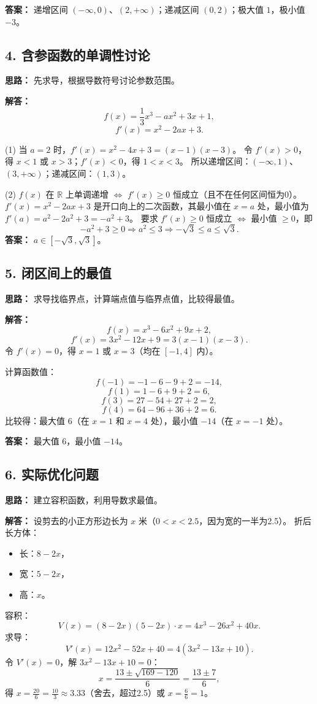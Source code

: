 \documentclass[10pt]{article}
\begin{document}
\textbf{答案：} 递增区间 $(-\infty,0)$、$(2,+\infty)$；递减区间 $(0,2)$；极大值 $1$，极小值 $-3$。

\subsection*{4. 含参函数的单调性讨论}
\textbf{思路：} 先求导，根据导数符号讨论参数范围。

\textbf{解答：}
$$f(x) = \frac{1}{3}x^3 - a x^2 + 3x + 1,$$
$$f'(x) = x^2 - 2a x + 3.$$

(1) 当 $a=2$ 时，$f'(x) = x^2 - 4x + 3 = (x-1)(x-3)$。
令 $f'(x) > 0$，得 $x < 1$ 或 $x > 3$；$f'(x) < 0$，得 $1 < x < 3$。
所以递增区间：$(-\infty, 1)$、$(3, +\infty)$；递减区间：$(1, 3)$。

(2) $f(x)$ 在 $\mathbb{R}$ 上单调递增 $\iff$ $f'(x) \ge 0$ 恒成立（且不在任何区间恒为0）。
$f'(x) = x^2 - 2a x + 3$ 是开口向上的二次函数，其最小值在 $x = a$ 处，最小值为 $f'(a) = a^2 - 2a^2 + 3 = -a^2 + 3$。
要求 $f'(x) \ge 0$ 恒成立 $\iff$ 最小值 $\ge 0$，即
$$-a^2 + 3 \ge 0 \Rightarrow a^2 \le 3 \Rightarrow -\sqrt{3} \le a \le \sqrt{3}.$$
\textbf{答案：} $a \in [-\sqrt{3}, \sqrt{3}]$。

\subsection*{5. 闭区间上的最值}
\textbf{思路：} 求导找临界点，计算端点值与临界点值，比较得最值。

\textbf{解答：}
$$f(x) = x^3 - 6x^2 + 9x + 2,$$
$$f'(x) = 3x^2 - 12x + 9 = 3(x-1)(x-3).$$
令 $f'(x) = 0$，得 $x = 1$ 或 $x = 3$（均在 $[-1,4]$ 内）。

计算函数值：
$$f(-1) = -1 - 6 - 9 + 2 = -14,$$
$$f(1) = 1 - 6 + 9 + 2 = 6,$$
$$f(3) = 27 - 54 + 27 + 2 = 2,$$
$$f(4) = 64 - 96 + 36 + 2 = 6.$$
比较得：最大值 $6$（在 $x=1$ 和 $x=4$ 处），最小值 $-14$（在 $x=-1$ 处）。

\textbf{答案：} 最大值 $6$，最小值 $-14$。

\subsection*{6. 实际优化问题}
\textbf{思路：} 建立容积函数，利用导数求最值。

\textbf{解答：}
设剪去的小正方形边长为 $x$ 米（$0 < x < 2.5$，因为宽的一半为2.5）。
折后长方体：
\begin{itemize}
    \item 长：$8 - 2x$，
    \item 宽：$5 - 2x$，
    \item 高：$x$。
\end{itemize}
容积：
$$V(x) = (8 - 2x)(5 - 2x) \cdot x = 4x^3 - 26x^2 + 40x.$$
求导：
$$V'(x) = 12x^2 - 52x + 40 = 4(3x^2 - 13x + 10).$$
令 $V'(x) = 0$，解 $3x^2 - 13x + 10 = 0$：
$$x = \frac{13 \pm \sqrt{169 - 120}}{6} = \frac{13 \pm 7}{6},$$
得 $x = \frac{20}{6} = \frac{10}{3} \approx 3.33$（舍去，超过2.5）或 $x = \frac{6}{6} = 1$。
\end{document}
